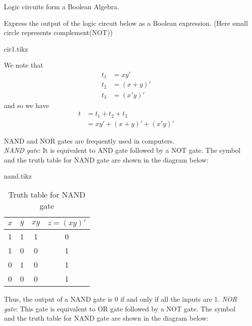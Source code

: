 \documentclass[../main-sheet.tex]{subfiles}
\begin{document}
    \begin{thm}
        Logic circuits form a Boolean Algebra.
    \end{thm}
    \newpage
    \begin{prob}
        Express the output of the logic circuit below as a Boolean expression. (Here small circle represents complement(NOT))
        \begin{center}
			{cir1.tikz}
		\end{center}
    \end{prob}
	\begin{soln}
		We note that 
		\begin{align*}
			t_1&=xy'\\
			t_2&=(x+y)'\\
			t_3&=(x'y)'
		\end{align*}
		and so we have
		\begin{align*}
			t&=t_1+t_2+t_3\\
			&=xy'+(x+y)'+(x'y)'
		\end{align*}
	\end{soln}
	NAND and NOR gates are frequently used in computers.\\
	\emph{NAND gate}: It is equivalent to AND gate followed by a NOT gate. The symbol and the truth table for NAND gate are shown in the diagram below:
	\begin{table}[H]
        \begin{minipage}[c]{0.5\textwidth}
            \centering
            {nand.tikz}
        \end{minipage}\hfill
        \begin{minipage}[c]{0.5\textwidth}
            \centering
            \begin{tabular}{cccc}
                \toprule
                $ x $ &$ y $& $ xy $& $ z=(xy)' $ \\
                \midrule
                1 & 1 & 1 & 0\\
                1 & 0 & 0 & 1\\
                0 & 1 & 0 & 1\\
                0 & 0 & 0 & 1\\
                \bottomrule
            \end{tabular}
            \caption{Truth table for NAND gate}
        \end{minipage}
    \end{table}
    Thus, the output of a NAND gate is 0 if and only if all the inputs are 1.
	\emph{NOR gate}: This gate is equivalent to OR gate followed by a NOT gate. The symbol and the truth table for NAND gate are shown in the diagram below:
\end{document}

